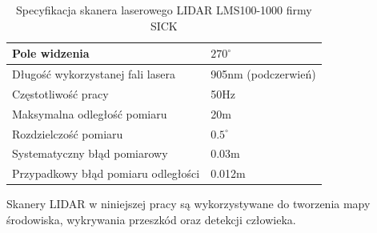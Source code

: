 \begin{table}[H]
\centering
{\renewcommand{\arraystretch}{1.5}
\begin{tabular}{ p{8cm} | p{4cm} }
 Pole widzenia & $270^{\circ}$\\
 \hline
 Długość wykorzystanej fali lasera & 905nm (podczerwień) \\
 \hline
 Częstotliwość pracy & 50Hz \\
 \hline
 Maksymalna odległość pomiaru & 20m \\
 \hline
 Rozdzielczość pomiaru & $0.5^{\circ}$ \\
 \hline
 Systematyczny błąd pomiarowy & 0.03m \\
 \hline
 Przypadkowy błąd pomiaru odległości & 0.012m \\
\end{tabular}}
\caption{Specyfikacja skanera laserowego LIDAR LMS100-1000 firmy SICK \cite{omnivelma}}
\label{tab:lidar_specification}
\end{table}


Skanery LIDAR w niniejszej pracy są wykorzystywane do tworzenia mapy środowiska, wykrywania przeszkód oraz detekcji człowieka.